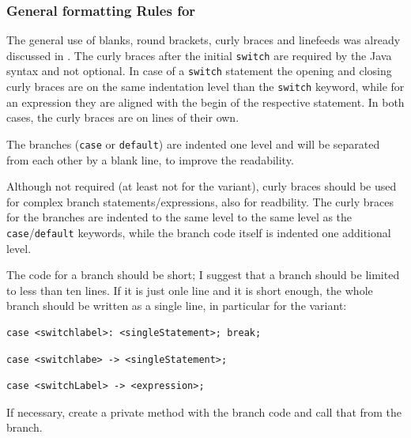 \subsubsection{General formatting Rules for }

The general use of blanks, round brackets, curly braces and linefeeds was already discussed in . The curly braces after the initial \lstinline|switch| are required by the Java syntax and not optional. In case of a \lstinline|switch| statement the opening and closing curly braces are on the same indentation level than the \lstinline|switch| keyword, while for an expression they are aligned with the begin of the respective statement. In both cases, the curly braces are on lines of their own.

The branches (\lstinline|case| or \lstinline|default|) are indented one level and will be separated from each other by a blank line, to improve the readability.

Although not required (at least not for the  variant), curly braces should be used for complex branch statements/expressions, also for readbility. The curly braces for the branches are indented to the same level to the same level as the \lstinline|case|/\lstinline|default| keywords, while the branch code itself is indented one additional level.

The code for a branch should be short; I suggest that a branch should be limited to less than ten lines. If it is just onle line and it is short enough, the whole branch should be written as a single line, in particular for the  variant:

\begin{lstlisting}
case <switchlabel>: <singleStatement>; break;
\end{lstlisting}

\begin{lstlisting}
case <switchlabe> -> <singleStatement>;
\end{lstlisting}

\begin{lstlisting}
case <switchLabel> -> <expression>;
\end{lstlisting}

If necessary, create a private method with the branch code and call that from the branch.


